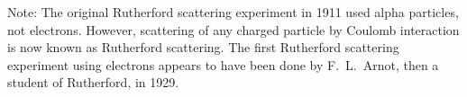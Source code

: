 \documentclass[12pt]{article}
\begin{document}
\bigskip
\noindent
Note:
The original Rutherford scattering experiment in 1911 used alpha particles, not electrons.
However, scattering of any charged particle by Coulomb interaction
is now known as Rutherford scattering.
The first Rutherford scattering experiment using electrons appears to have
been done by F.~L.~Arnot, then a student of Rutherford, in 1929.
\end{document}
